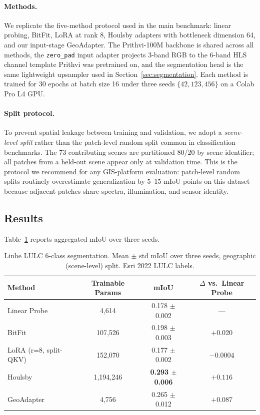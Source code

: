 \documentclass[11pt]{article}
\begin{document}
\paragraph{Methods.} We replicate the five-method protocol used in the main benchmark: linear probing, BitFit, LoRA at rank 8, Houlsby adapters with bottleneck dimension 64, and our input-stage GeoAdapter. The Prithvi-100M backbone is shared across all methods, the \texttt{zero\_pad} input adapter projects 3-band RGB to the 6-band HLS channel template Prithvi was pretrained on, and the segmentation head is the same lightweight upsampler used in Section~\ref{sec:segmentation}. Each method is trained for 30 epochs at batch size 16 under three seeds $\{42, 123, 456\}$ on a Colab Pro L4 GPU.

\paragraph{Split protocol.} To prevent spatial leakage between training and validation, we adopt a \emph{scene-level split} rather than the patch-level random split common in classification benchmarks. The 73 contributing scenes are partitioned 80/20 by scene identifier; all patches from a held-out scene appear only at validation time. This is the protocol we recommend for any GIS-platform evaluation: patch-level random splits routinely overestimate generalization by 5--15 mIoU points on this dataset because adjacent patches share spectra, illumination, and sensor identity.

\subsection{Results}

Table~\ref{tab:linhe-lulc} reports aggregated mIoU over three seeds.

\begin{table}[h]
\centering
\small
\caption{Linhe LULC 6-class segmentation. Mean $\pm$ std mIoU over three seeds, geographic (scene-level) split. Esri 2022 LULC labels.}
\label{tab:linhe-lulc}
\begin{tabular}{lccc}
\toprule
Method & Trainable Params & mIoU & $\Delta$ vs.\ Linear Probe \\
\midrule
Linear Probe & 4{,}614       & 0.178 $\pm$ 0.002 & --- \\
BitFit       & 107{,}526     & 0.198 $\pm$ 0.003 & $+0.020$ \\
LoRA (r=8, split-QKV) & 152{,}070 & 0.177 $\pm$ 0.002 & $-0.0004$ \\
Houlsby      & 1{,}194{,}246 & \textbf{0.293 $\pm$ 0.006} & $\mathbf{+0.116}$ \\
GeoAdapter   & 4{,}756       & 0.265 $\pm$ 0.012 & $+0.087$ \\
\bottomrule
\end{tabular}
\end{table}
\end{document}
